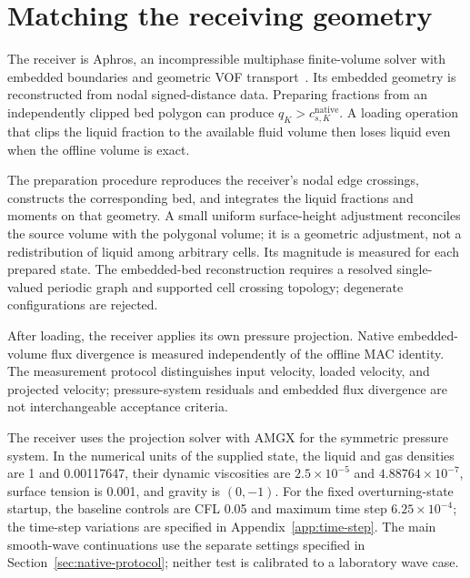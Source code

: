 \documentclass[10pt]{article}
\begin{document}
\section{Matching the receiving geometry}
The receiver is Aphros, an incompressible multiphase finite-volume solver
with embedded boundaries and geometric VOF transport~\citep{karnakov,aphros}. Its
embedded geometry is reconstructed from nodal signed-distance data.
Preparing fractions from an independently clipped bed polygon can produce
$q_K>c_{s,K}^{\mathrm{native}}$. A loading operation that clips the liquid
fraction to the available fluid volume then loses liquid even when the
offline volume is exact.

The preparation procedure reproduces the receiver's nodal edge crossings,
constructs the corresponding bed, and integrates the liquid fractions and
moments on that geometry. A small uniform surface-height adjustment
reconciles the source volume with the polygonal volume; it is a
geometric adjustment, not a redistribution of liquid among arbitrary cells.
Its magnitude is measured for each prepared state. The embedded-bed
reconstruction requires a resolved single-valued periodic graph and supported
cell crossing topology; degenerate configurations are rejected.

After loading, the receiver applies its own pressure projection. Native
embedded-volume flux divergence is measured independently of the offline
MAC identity. The measurement protocol distinguishes input velocity, loaded
velocity, and projected velocity; pressure-system residuals and embedded
flux divergence are not interchangeable acceptance criteria.

The receiver uses the projection solver with AMGX for the symmetric
pressure system. In the numerical units of the supplied state, the liquid
and gas densities are 1 and 0.00117647, their dynamic viscosities are
$2.5\times10^{-5}$ and $4.88764\times10^{-7}$, surface tension is 0.001,
and gravity is $(0,-1)$. For the fixed overturning-state startup, the baseline controls are CFL
0.05 and maximum time step $6.25\times10^{-4}$; the time-step variations
are specified in Appendix~\ref{app:time-step}. The main smooth-wave
continuations use the separate settings specified in
Section~\ref{sec:native-protocol}; neither test is calibrated to a
laboratory wave case.
\end{document}
